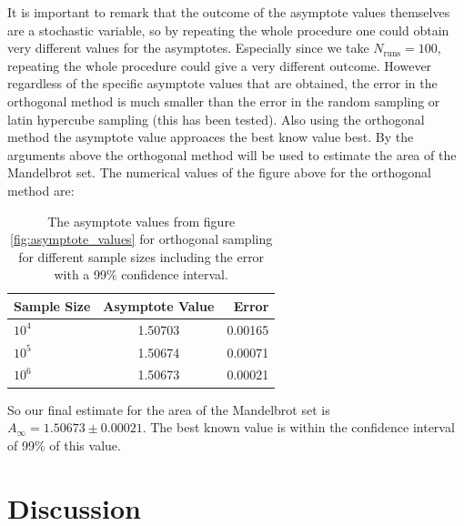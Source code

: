 \documentclass[10pt,a4paper]{article}
\begin{document}
\noindent It is important to remark that the outcome of the asymptote values themselves are a stochastic variable, so by repeating the whole procedure one could obtain very different values for the asymptotes. Especially since we take $N_{\text{runs}} = 100$, repeating the whole procedure could give a very different outcome. However regardless of the specific asymptote values that are obtained, the error in the orthogonal method is much smaller than the error in the random sampling or latin hypercube sampling (this has been tested). Also using the orthogonal method the asymptote value approaces the best know value best. By the arguments above the orthogonal method will be used to estimate the area of the Mandelbrot set. The numerical values of the figure above for the orthogonal method are:\\
\newline
\begin{center}
\begin{table}[H]
\centering
\begin{tabular}{l c r}
Sample Size & Asymptote Value & Error\\
\hline
$10^4$ & 1.50703 & 0.00165 \\
$10^5$ & 1.50674 & 0.00071 \\
$10^6$ & 1.50673 & 0.00021 \\
\hline
\end{tabular}
\caption[width=5.0cm]{The asymptote values from figure \ref{fig:asymptote_values} for orthogonal sampling for different sample sizes including the error with a 99$\%$ confidence interval.}
\end{table}
\end{center}
So our final estimate for the area of the Mandelbrot set is $A_{\infty} = 1.50673 \pm 0.00021$. The best known value is within the confidence interval of 99$\%$ of this value.

\section{Discussion}
\end{document}
